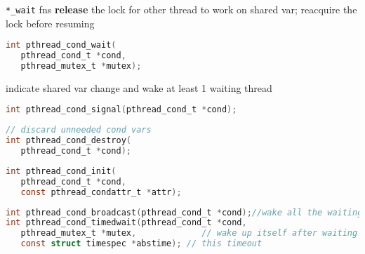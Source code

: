 \begin{minipage}{0.5\linewidth}
  \flushleft
  \texttt{*\_wait} fns \textbf{release} the lock for other thread to work on shared var; reacquire the lock before resuming
\end{minipage}
\begin{minipage}{0.5\linewidth}
\begin{lstlisting}[language=C,xleftmargin=1pt,xrightmargin=2pt]
int pthread_cond_wait(
   pthread_cond_t *cond,
   pthread_mutex_t *mutex);
\end{lstlisting}
\end{minipage}
\begin{minipage}{0.5\linewidth}
  \flushleft
  indicate shared var change and wake at least 1 waiting thread
\end{minipage}
\begin{minipage}{0.5\linewidth}
\begin{lstlisting}[language=C,xleftmargin=1pt,xrightmargin=2pt]
int pthread_cond_signal(pthread_cond_t *cond);
\end{lstlisting}
\end{minipage}
\begin{minipage}{0.5\linewidth}
\begin{lstlisting}[language=C,xrightmargin=2pt]
// discard unneeded cond vars
int pthread_cond_destroy(
   pthread_cond_t *cond);
\end{lstlisting}
\end{minipage}
\begin{minipage}{0.5\linewidth}
\begin{lstlisting}[language=C,xleftmargin=2pt]
int pthread_cond_init(
   pthread_cond_t *cond,
   const pthread_condattr_t *attr);
\end{lstlisting}
\end{minipage}
\begin{lstlisting}[language=C]
int pthread_cond_broadcast(pthread_cond_t *cond);//wake all the waiting
int pthread_cond_timedwait(pthread_cond_t *cond,
   pthread_mutex_t *mutex,             // wake up itself after waiting for
   const struct timespec *abstime); // this timeout
\end{lstlisting}
